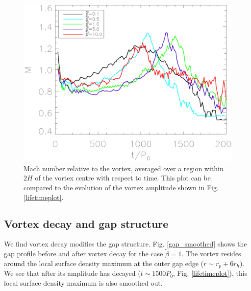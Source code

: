 \begin{figure}
  \includegraphics[width=\linewidth]{figures/mach}
  \caption{Mach number relative to
    the vortex, averaged over a region within $2H$ of the  
    vortex centre with respect to time. This plot can be compared to the evolution of the
    vortex amplitude shown in Fig. \ref{lifetimeplot}.
    \label{machplot}}
\end{figure}

\subsection{Vortex decay and gap structure}  
We find vortex decay modifies the gap
structure. Fig. \ref{gap_smoothed} shows the gap profile before and
after vortex decay for the case $\tilde{\beta}=1$. The vortex resides
around the local surface density maximum at the outer gap edge ($r\sim r_p +
6r_h$). We see that after its amplitude has decayed ($t\sim1500P_0$,   
Fig. \ref{lifetimeplot}), this local surface density maximum is also 
smoothed out.

